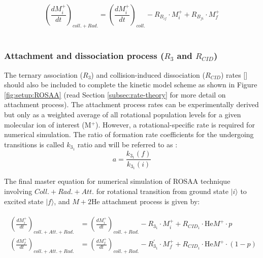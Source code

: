 \begin{equation}
    \left( \frac{dM^+_i}{dt} \right) _{coll. + Rad.} = \left( \frac{dM^+_i}{dt} \right) _{coll.}
     - R_{B_{if}} \cdot M^+_i + R_{B_{fi}} \cdot M^+_f
    \label{eqn:sim:radiative}
\end{equation}
\\

\subsubsection{Attachment and dissociation process (\texorpdfstring{$R_3$}{R_3} and \texorpdfstring{$R_{CID}$}{R_CID})}
\label{subsec:ROSAA-simulation-att}

The ternary association ($R_3$) and collision-induced dissociation ($R_{CID}$) rates [\pers] should also be included to complete the kinetic model scheme as shown in Figure \ref{fig:setup:ROSAA} (read Section \ref{subsec:rate-theory} for more detail on attachment process). The attachment process rates can be experimentally derived but only as a weighted average of all rotational population levels for a given molecular ion of interest (M$^+$). However, a rotational-specific rate is required for numerical simulation. The ratio of formation rate coefficients for the undergoing transitions is called $k_{3_1}$ ratio and will be referred to as :
\begin{equation}
    a = \frac{k_{3_1}(f)}{k_{3_1}(i)}
    \label{eqn:k3_ratio}
\end{equation}

The final master equation for numerical simulation of ROSAA technique involving $Coll. + Rad. + Att.$ for rotational transition from ground state $|i\rangle$ to excited state $|f\rangle$, and $M+ 2\text{He} $ attachment process is given by:

\begin{align*}
    \begin{split}
        \left( \frac{dM^+_{i}}{dt} \right) _{coll. + Att.+ Rad.} 
        & = \left( \frac{dM^+_{i}}{dt} \right) _{coll. +  Rad.}
    -R_{3_1} \cdot M^+_{i} + R_{CID_1} \cdot \text{He}M^+ \cdot p
    \\
    \left( \frac{dM^+_{f}}{dt} \right) _{coll. + Att.+ Rad.} 
    &= \left( \frac{dM^+_{f}}{dt} \right) _{coll. +Rad.}
    -R^{'}_{3_1} \cdot M^+_{f} + R_{CID_1} \cdot \text{He}M^+ \cdot (1-p)
    \end{split}
\end{align*}

